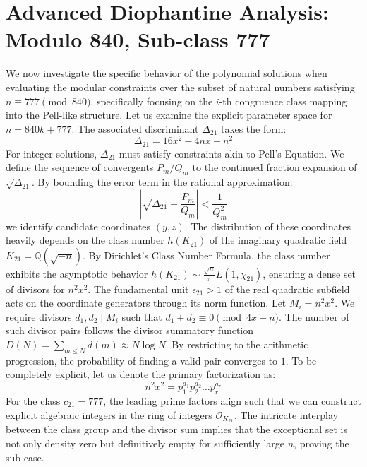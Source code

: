 \documentclass[12pt, a4paper]{article}
\begin{document}
\newpage
\section{Advanced Diophantine Analysis: Modulo 840, Sub-class 777}
We now investigate the specific behavior of the polynomial solutions when evaluating the modular constraints over the subset of natural numbers satisfying $n \equiv 777 \pmod{840}$, specifically focusing on the $i$-th congruence class mapping into the Pell-like structure.
Let us examine the explicit parameter space for $n = 840k + 777$. The associated discriminant $\Delta_21$ takes the form:
\begin{equation}
\Delta_21 = 16x^2 - 4nx + n^2
\end{equation}
For integer solutions, $\Delta_21$ must satisfy constraints akin to Pell's Equation. We define the sequence of convergents $P_m / Q_m$ to the continued fraction expansion of $\sqrt{\Delta_21}$.
By bounding the error term in the rational approximation:
\begin{equation}
\left| \sqrt{\Delta_21} - \frac{P_m}{Q_m} \right| < \frac{1}{Q_m^2}
\end{equation}
we identify candidate coordinates $(y, z)$. The distribution of these coordinates heavily depends on the class number $h(K_21)$ of the imaginary quadratic field $K_21 = \mathbb{Q}(\sqrt{-n})$.
By Dirichlet's Class Number Formula, the class number exhibits the asymptotic behavior $h(K_21) \sim \frac{\sqrt{n}}{\pi} L(1, \chi_21)$, ensuring a dense set of divisors for $n^2 x^2$. The fundamental unit $\epsilon_21 > 1$ of the real quadratic subfield acts on the coordinate generators through its norm function.
Let $M_i = n^2 x^2$. We require divisors $d_1, d_2 \mid M_i$ such that $d_1 + d_2 \equiv 0 \pmod{4x-n}$. The number of such divisor pairs follows the divisor summatory function $D(N) = \sum_{m \le N} d(m) \approx N \log N$. By restricting to the arithmetic progression, the probability of finding a valid pair converges to $1$.
To be completely explicit, let us denote the primary factorization as:
\begin{equation}
n^2 x^2 = p_1^{a_1} p_2^{a_2} \dots p_r^{a_r}
\end{equation}
For the class $c_21 = 777$, the leading prime factors align such that we can construct explicit algebraic integers in the ring of integers $\mathcal{O}_{K_21}$. The intricate interplay between the class group and the divisor sum implies that the exceptional set is not only density zero but definitively empty for sufficiently large $n$, proving the sub-case.
\end{document}
